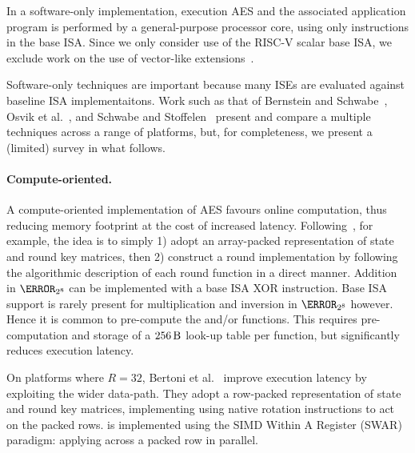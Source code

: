 
In a software-only implementation,
execution
AES
and
the associated application program
is 
performed by 
a general-purpose processor core, using only instructions in the base ISA.
Since we only consider use of the RISC-V scalar base ISA, we exclude work on
the use of vector-like extensions~\cite{Hamburg:09}.

Software-only techniques are important because 
many ISEs are evaluated against baseline ISA implementaitons.
Work such as that of
Bernstein and Schwabe~\cite{BerSch:08},
Osvik et al.~\cite{OBSC:10},
and
Schwabe and Stoffelen~\cite{SchSto:16}
present and compare a multiple techniques across a range of platforms, but,
for completeness, we present a (limited) survey in what follows.


\paragraph{Compute-oriented.}

A compute-oriented implementation of AES favours
 online     computation, 
thus reducing 
memory footprint
at the cost of increased 
latency.
Following~\cite[Section 4.1]{DaeRij:02}, for example, the idea is to simply
1) adopt an
    array-packed
   representation of state and round key matrices,
   then
2) construct a round implementation by following the algorithmic description
   of each round function in a direct manner.
Addition in $\F_{2^8}$ can be implemented with a base ISA XOR instruction.
Base ISA support is rarely present for multiplication and inversion in
$\F_{2^8}$ however.
Hence it is common to pre-compute the  and/or  
functions.
This requires pre-computation and storage of a
$
\SI{256}{\byte}
$
look-up table per function, but significantly reduces execution latency.

On platforms where $R = 32$,
Bertoni et al.~\cite{BBFMM:02}
improve execution latency by exploiting the wider data-path.
They adopt a row-packed representation of state and round key matrices,
implementing
using native rotation instructions to act on the packed rows.
 is implemented
using the SIMD Within A Register (SWAR) paradigm:
applying
across a packed row in parallel.


